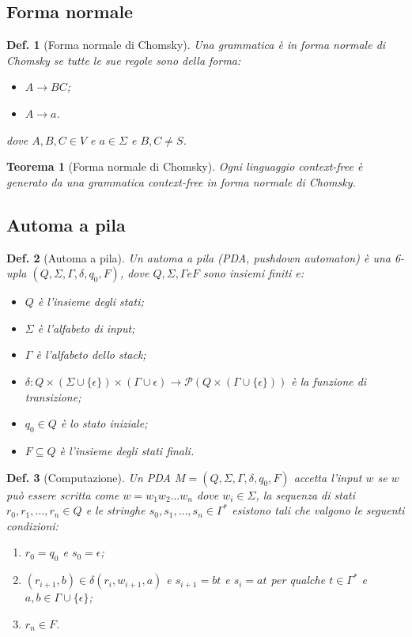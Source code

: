 \documentclass[11pt]{article}
\newtheorem{definition}{Def.}[section]
\newtheorem{theorem}{Teorema}[section]
\begin{document}
\subsection{Forma normale}

\begin{definition}[Forma normale di Chomsky]
	Una grammatica è in forma normale di Chomsky se tutte le sue regole sono
	della forma:
	\begin{itemize}
		\item $A \rightarrow BC$;
		\item $A \rightarrow a$.
	\end{itemize}
	dove $A, B, C \in V$ e $a \in \Sigma$ e $B, C \neq S$.
\end{definition}

\begin{theorem}[Forma normale di Chomsky]
	Ogni linguaggio context-free è generato da una grammatica context-free in 
	forma normale di Chomsky.
\end{theorem}

\subsection{Automa a pila} 

\begin{definition}[Automa a pila]
	Un automa a pila (PDA, pushdown automaton) è una 6-upla $(Q, \Sigma, \Gamma,
	\delta, q_0, F)$, dove $Q, \Sigma, \Gamma e F$ sono insiemi finiti e:
	\begin{itemize}
		\item $Q$ è l'insieme degli stati;
		\item $\Sigma$ è l'alfabeto di input;
		\item $\Gamma$ è l'alfabeto dello stack;
		\item $\delta : Q \times (\Sigma \cup \{\epsilon\}) \times (\Gamma \cup
			\epsilon) \rightarrow \mathcal{P}(Q \times (\Gamma \cup \{\epsilon\}))$ 
			è la funzione di transizione;
		\item $q_0 \in Q$ è lo stato iniziale;
		\item $F \subseteq Q$ è l'insieme degli stati finali.
	\end{itemize}
\end{definition}

\begin{definition}[Computazione]
	Un PDA $M = (Q, \Sigma, \Gamma, \delta, q_0, F)$ accetta l'input $w$ se
	$w$ può essere scritta come $w = w_1w_2\dots w_n$ dove $w_i \in \Sigma$, 
	la sequenza di stati $r_0, r_1, \dots, r_n \in Q$ e le stringhe $s_0, s_1,
	\dots, s_n \in \Gamma^*$ esistono tali che valgono le seguenti condizioni:
	\begin{enumerate}
		\item $r_0 = q_0$ e $s_0 = \epsilon$;
		\item $(r_{i+1}, b) \in \delta(r_i, w_{i+1}, a)$ e $s_{i+1} = bt$ e $s_i
			= at$ per qualche $t \in \Gamma^*$ e $a, b \in \Gamma \cup 
			\{\epsilon\}$;
		\item $r_n \in F$.
	\end{enumerate}
\end{definition}
\end{document}
